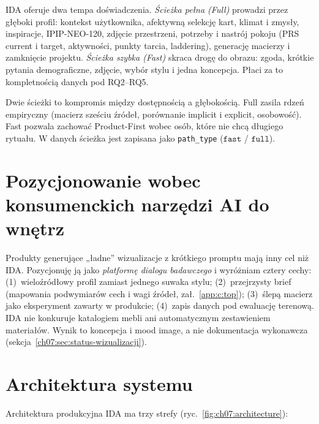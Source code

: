 IDA oferuje dwa tempa doświadczenia. \emph{Ścieżka pełna (Full)} prowadzi przez głęboki profil: kontekst użytkownika, afektywną selekcję kart, klimat i zmysły, inspiracje, IPIP-NEO-120, zdjęcie przestrzeni, potrzeby i nastrój pokoju (PRS current i target, aktywności, punkty tarcia, laddering), generację macierzy i zamknięcie projektu.
\emph{Ścieżka szybka (Fast)} skraca drogę do obrazu: zgoda, krótkie pytania demograficzne, zdjęcie, wybór stylu i jedna koncepcja. Płaci za to kompletnością danych pod RQ2--RQ5.

Dwie ścieżki to kompromis między dostępnością a głębokością. Full zasila rdzeń empiryczny (macierz sześciu źródeł, porównanie implicit i explicit, osobowość). Fast pozwala zachować Product-First wobec osób, które nie chcą długiego rytuału. W danych ścieżka jest zapisana jako \texttt{path\_type} ($\mathtt{fast}$ / $\mathtt{full}$).

\section{Pozycjonowanie wobec konsumenckich narzędzi AI do wnętrz}
\label{ch07:sec:pozycjonowanie}

Produkty generujące „ładne” wizualizacje z krótkiego promptu mają inny cel niż IDA. Pozycjonuję ją jako \emph{platformę dialogu badawczego} i wyróżniam cztery cechy: (1)~wieloźródłowy profil zamiast jednego suwaka stylu; (2)~przejrzysty brief (mapowania podwymiarów cech i wagi źródeł, zał.~\ref{app:c:top}); (3)~ślepą macierz jako eksperyment zawarty w produkcie; (4)~zapis danych pod ewaluację terenową.
IDA nie konkuruje katalogiem mebli ani automatycznym zestawieniem materiałów. Wynik to koncepcja i mood image, a nie dokumentacja wykonawcza (sekcja~\ref{ch07:sec:status-wizualizacji}).

\section{Architektura systemu}
\label{ch07:sec:architektura}

Architektura produkcyjna IDA ma trzy strefy (ryc.~\ref{fig:ch07:architecture}):

